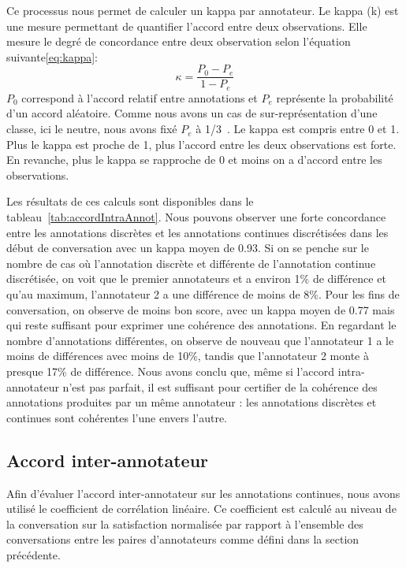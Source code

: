 Ce processus nous permet de calculer un kappa par annotateur.
Le kappa (k) est une mesure permettant de quantifier l'accord entre deux observations. Elle mesure le degré de concordance entre deux observation selon l'équation suivante\ref{eq:kappa}:
\begin{equation}
    \kappa = \dfrac{P_0 - P_e}{1 - P_e}
    \label{eq:kappa}
\end{equation}
$P_0$ correspond à l'accord relatif entre annotations et $P_e$ représente la probabilité d'un accord aléatoire. Comme nous avons un cas de sur-représentation d'une classe, ici le neutre, nous avons fixé $P_e$ à 1/3~\cite{Callejas2008}.
Le kappa est compris entre 0 et 1. Plus le kappa est proche de 1, plus l'accord entre les deux observations est forte. En revanche, plus le kappa se rapproche de 0 et moins on a d'accord entre les observations.


Les résultats de ces calculs sont disponibles dans le tableau~\ref{tab:accordIntraAnnot}. Nous pouvons observer une forte concordance entre les annotations discrètes et les annotations continues discrétisées dans les début de conversation avec un kappa moyen de 0.93. Si on se penche sur le nombre de cas où l'annotation discrète et différente de l'annotation continue discrétisée, on voit que le premier annotateurs et a environ 1\% de différence et qu'au maximum, l'annotateur 2 a une différence de moins de 8\%.
Pour les fins de conversation, on observe de moins bon score, avec un kappa moyen de 0.77 mais qui reste suffisant pour exprimer une cohérence des annotations. En regardant le nombre d'annotations différentes, on observe de nouveau que l'annotateur 1 a le moins de différences avec moins de 10\%, tandis que l'annotateur 2 monte à presque 17\% de différence.
Nous avons conclu que, même si l'accord intra-annotateur n'est pas parfait, il est suffisant pour certifier de la cohérence des annotations produites par un même annotateur : les annotations discrètes et continues sont cohérentes l'une envers l'autre.

\subsection{Accord inter-annotateur}
Afin d’évaluer l’accord inter-annotateur sur les annotations continues, nous avons utilisé le coefficient de corrélation linéaire. Ce coefficient est calculé au niveau de la conversation sur la satisfaction normalisée par rapport à l’ensemble des conversations entre les paires d’annotateurs comme défini dans la section précédente.

